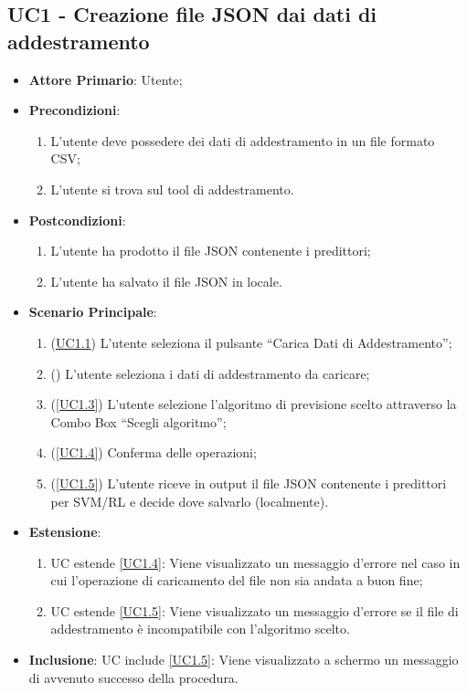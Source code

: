 	\subsection{UC1 - Creazione file JSON dai dati di addestramento}
		\begin{itemize}
			\item\textbf{Attore Primario}: Utente;
			\item\textbf{Precondizioni}: 
				\begin{enumerate}
					\item L’utente deve possedere dei dati di addestramento in un file formato CSV;
					\item L’utente si trova sul tool di addestramento.
				\end{enumerate}
			\item\textbf{Postcondizioni}:
				\begin{enumerate}
					\item L’utente ha prodotto il file JSON contenente i predittori;
					\item L’utente ha salvato il file JSON in locale.
				\end{enumerate}
			\item\textbf{Scenario Principale}:
				\begin{enumerate}
					\item (\hyperref[par:UC1.1]{UC1.1}) L’utente seleziona il pulsante “Carica Dati di Addestramento”;
					\item (\label{par:UC1.2}) L’utente seleziona i dati di addestramento da caricare;
					\item (\ref{UC1.3}) L’utente selezione l’algoritmo di previsione scelto attraverso la Combo Box “Scegli algoritmo”; 
					\item (\ref{UC1.4}) Conferma delle operazioni; 
					\item (\ref{UC1.5}) L’utente riceve in output il file JSON contenente i predittori per SVM/RL e decide dove salvarlo (localmente).  

				\end{enumerate}
			\item\textbf{Estensione}:
				\begin{enumerate}
					\item UC estende \ref{UC1.4}: Viene visualizzato un messaggio d’errore nel caso in cui l’operazione di caricamento del file non sia andata a buon fine;
					\item  UC estende \ref{UC1.5}: Viene visualizzato un messaggio d’errore se il file di addestramento è incompatibile con l’algoritmo scelto. 
				\end{enumerate}
			\item\textbf{Inclusione}: UC include \ref{UC1.5}:  Viene visualizzato a schermo un messaggio di avvenuto successo della procedura.
		\end{itemize}
		
